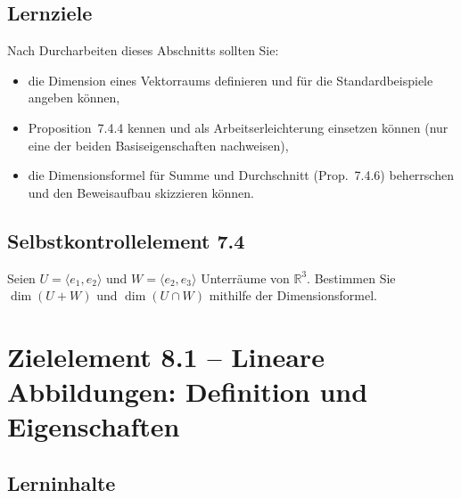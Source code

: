 \documentclass[a4paper,12pt]{article}
\begin{document}
\subsection*{Lernziele}

Nach Durcharbeiten dieses Abschnitts sollten Sie:
\begin{itemize}
  \item die Dimension eines Vektorraums definieren und für die Standardbeispiele
        angeben können,
  \item Proposition~7.4.4 kennen und als Arbeitserleichterung einsetzen können
        (nur eine der beiden Basiseigenschaften nachweisen),
  \item die Dimensionsformel für Summe und Durchschnitt (Prop.~7.4.6) beherrschen
        und den Beweisaufbau skizzieren können.
\end{itemize}

\subsection*{Selbstkontrollelement 7.4}

Seien $U = \langle e_1, e_2 \rangle$ und $W = \langle e_2, e_3 \rangle$ Unterräume
von $\mathbb{R}^3$. Bestimmen Sie $\dim(U+W)$ und $\dim(U \cap W)$
mithilfe der Dimensionsformel.

\newpage

\section*{Zielelement 8.1 -- Lineare Abbildungen: Definition und Eigenschaften}

\subsection*{Lerninhalte}

\begin{center}
\end{center}
\end{document}
